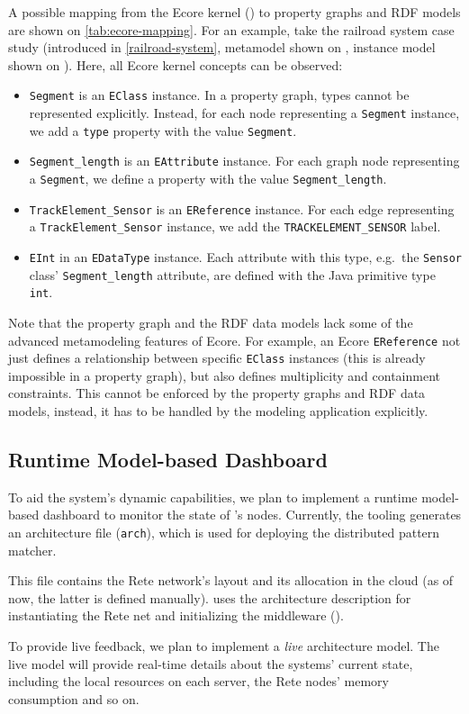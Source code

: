A possible mapping from the Ecore kernel () to property graphs and RDF models are shown on \autoref{tab:ecore-mapping}. For an example, take the railroad system case study (introduced in \autoref{railroad-system}, metamodel shown on , instance model shown on ). Here, all Ecore kernel concepts can be observed:
\begin{itemize}
  \item \verb+Segment+ is an \verb+EClass+ instance. In a property graph, types cannot be represented explicitly. Instead, for each node representing a \verb+Segment+ instance, we add a \verb+type+ property with the value \verb+Segment+.
  \item \verb+Segment_length+ is an \verb+EAttribute+ instance. For each graph node representing a \verb+Segment+, we define a property with the value \verb+Segment_length+.
  \item \verb+TrackElement_Sensor+ is an \verb+EReference+ instance. For each edge representing a \verb+TrackElement_Sensor+ instance, we add the \verb+TRACKELEMENT_SENSOR+ label.
  \item \verb+EInt+ in an \verb+EDataType+ instance. Each attribute with this type, e.g.\ the \verb+Sensor+ class' \verb+Segment_length+ attribute, are defined with the Java primitive type \verb+int+.
\end{itemize}
Note that the property graph and the RDF data models lack some of the advanced metamodeling features of Ecore. For example, an Ecore \verb+EReference+ not just defines a relationship between specific \verb+EClass+ instances (this is already impossible in a property graph), but also defines multiplicity and containment constraints. This cannot be enforced by the property graphs and RDF data models, instead, it has to be handled by the modeling application explicitly. 

\subsection{Runtime Model-based Dashboard}
\label{dashboard}

To aid the system's dynamic capabilities, we plan to implement a runtime model-based dashboard to monitor the state of \iqd{}'s nodes. Currently, the \iqd{} tooling generates an architecture file (\texttt{arch}), which is used for deploying the distributed pattern matcher.

This file contains the Rete network's layout and its allocation in the cloud (as of now, the latter is defined manually). \iqd{} uses the architecture description for instantiating the Rete net and initializing the middleware ().


To provide live feedback, we plan to implement a \emph{live} architecture model. The live model will provide real-time details about the systems' current state, including the local resources on each server, the Rete nodes' memory consumption and so on.
